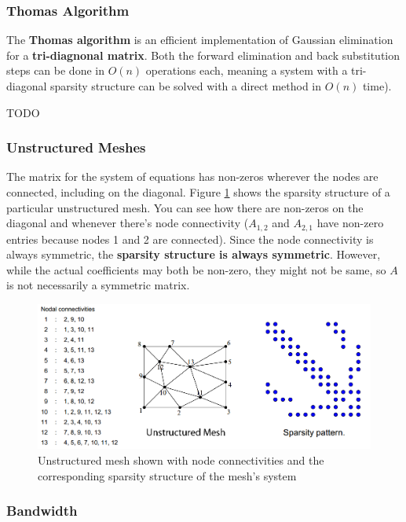 \documentclass{article}
\begin{document}
\subsubsection{Thomas Algorithm}

The \textbf{Thomas algorithm} is an efficient implementation of Gaussian elimination for a \textbf{tri-diagnonal matrix}. Both the forward elimination and back substitution steps can be done in $O(n)$ operations each, meaning a system with a tri-diagonal sparsity structure can be solved with a direct method in $O(n)$ time).

TODO

\subsubsection{Unstructured Meshes}

The matrix for the system of equations has non-zeros wherever the nodes are connected, including on the diagonal. Figure \ref{fig:unstructured-mesh-sparsity} shows the sparsity structure of a particular unstructured mesh. You can see how there are non-zeros on the diagonal and whenever there's node connectivity ($A_{1,2}$ and $A_{2,1}$ have non-zero entries because nodes 1 and 2 are connected). Since the node connectivity is always symmetric, the \textbf{sparsity structure is always symmetric}. However, while the actual coefficients may both be non-zero, they might not be same, so $A$ is not necessarily a symmetric matrix.
\begin{figure}
	\centering
	\includegraphics[scale=0.4]{figures/unstructurered-sparsity-structure.png}
	\caption{Unstructured mesh shown with node connectivities and the corresponding sparsity structure of the mesh's system}
	\label{fig:unstructured-mesh-sparsity}
\end{figure}

\subsubsection{Bandwidth}
\end{document}
